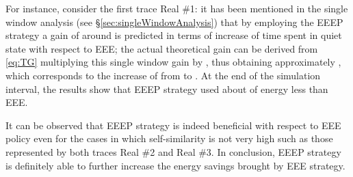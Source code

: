 \documentclass[journal,10pt,twoside,final]{IEEEtran}
\begin{document}
For instance, consider the first trace Real \#1: it has been mentioned in the single window analysis (see \S\ref{sec:singleWindowAnalysis}) that by employing the EEEP strategy a gain of around  is predicted in terms of increase of time spent in quiet state with respect to EEE; the actual theoretical gain can be derived from \eqref{eq:TG} multiplying this single window gain by , thus obtaining approximately , which corresponds to the increase of  from  to . At the end of the simulation interval, the results show that EEEP strategy used about  of energy less than EEE.

It can be observed that EEEP strategy is indeed beneficial with respect to EEE policy even for the cases in which self-similarity is not very high such as those represented by both traces Real \#2 and Real \#3. In conclusion, EEEP strategy is definitely able to further increase the energy savings brought by EEE strategy.
\end{document}
